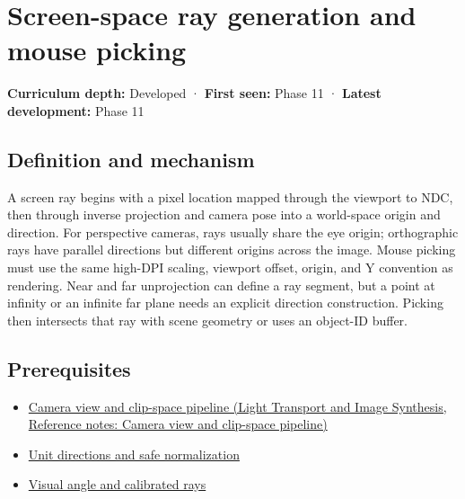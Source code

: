 \hypertarget{appendix-f1a6d43e80d1}{}\label{referencestart:appendix-f1a6d43e80d1}
\section{Screen-space ray generation and mouse picking}\label{appendix-f1a6d43e80d1-screen-space-ray-generation-and-mouse-picking}

\hypertarget{appendix-f1a6d43e80d1-screen-space-ray-generation-and-mouse-picking}{}

\textbf{Curriculum depth:} Developed · \textbf{First seen:} Phase 11 · \textbf{Latest development:} Phase 11

\begin{allmightroledefinition}

\subsection{Definition and mechanism}\label{appendix-f1a6d43e80d1-definition-and-mechanism}

\hypertarget{appendix-f1a6d43e80d1-definition-and-mechanism}{}

A screen ray begins with a pixel location mapped through the viewport to NDC, then through inverse projection and camera pose into a world-space origin and direction. For perspective cameras, rays usually share the eye origin; orthographic rays have parallel directions but different origins across the image. Mouse picking must use the same high-DPI scaling, viewport offset, origin, and Y convention as rendering. Near and far unprojection can define a ray segment, but a point at infinity or an infinite far plane needs an explicit direction construction. Picking then intersects that ray with scene geometry or uses an object-ID buffer.

\end{allmightroledefinition}

\subsection{Prerequisites}\label{appendix-f1a6d43e80d1-prerequisites}

\hypertarget{appendix-f1a6d43e80d1-prerequisites}{}

\begin{itemize}
\tightlist
\item
  \href{../04-Light-Transport-and-Image-Synthesis/main.pdf\#nameddest=appendix-1c07d64f5e70}{Camera view and clip-space pipeline (Light Transport and Image Synthesis, Reference notes: Camera view and clip-space pipeline)}
\item
  \hyperref[appendix-f744e41b95b4]{Unit directions and safe normalization}
\item
  \hyperref[appendix-7d356c396d1a]{Visual angle and calibrated rays}
\end{itemize}

